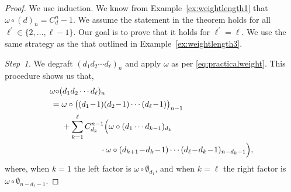 \documentclass[5p,twocolumn]{elsarticle}
\begin{document}
%
\begin{proof}
  We use induction. We know from Example~\ref{ex:weightlength1} that $\omega\circ(d)_n=C_d^{n}-1$.
  We assume the statement in the theorem holds for all $\ell^\prime\in\{2,\ldots,\ell-1\}$.
  Our goal is to prove that it holds for $\ell^\prime=\ell$. We use the same strategy as the that outlined in Example~\ref{ex:weightlength3}.
  
  \emph{Step~1.} We degraft $(d_1d_2\cdots d_\ell)_n$ and apply $\omega$ as per \eqref{eq:practicalweight}. This procedure shows us that,  
  \begin{align*}
    \omega\circ&(d_1d_2\cdots d_\ell)_n\\
                  =&\;\omega\circ\bigl((d_1\!-\!1)(d_2\!-\!1)\cdots(d_\ell\!-\!1)\bigr)_{n-1}\\                      
                   &\;+\sum_{k=1}^{\ell}C^{n-1}_{d_k}\Bigl(\omega\circ(d_1\cdots d_{k-1})_{d_k}\\
                   &\qquad\qquad\quad\cdot\omega\circ(d_{k+1}\!-\!d_k\!-\!1)\cdots(d_\ell\!-\!d_k\!-\!1)_{n-d_k-1}\Bigr),
  \end{align*}
  where, when $k=1$ the left factor is $\omega\circ\emptyset_{d_1}$, and when $k=\ell$ the right factor is $\omega\circ\emptyset_{n-d_\ell-1}$.


\end{proof}
\end{document}
